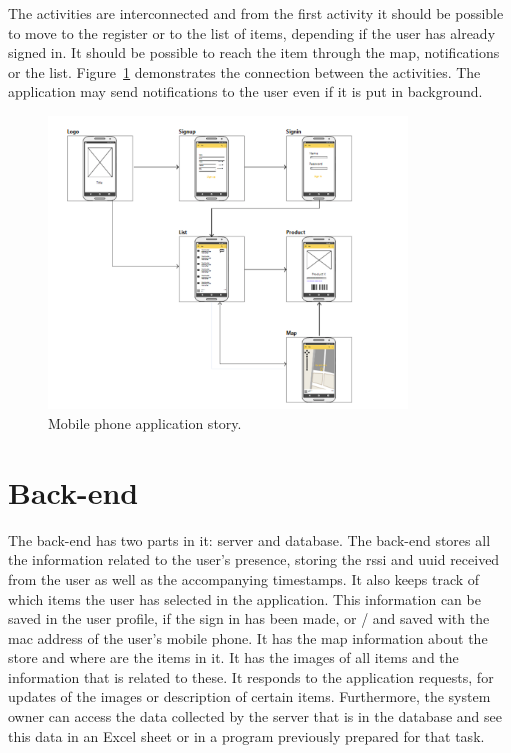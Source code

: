 The activities are interconnected and from the first activity it should be possible to move to the register or to the list of items, depending if the user has already signed in. It should be possible to reach the item through the map, notifications or the list.
Figure~\ref{fig:app_story} demonstrates the connection between the activities. The application may send notifications to the user even if it is put in background.
\begin{figure}[!htb]
	\centering
	\includegraphics[width=0.85\textwidth]{Figures/story.png}
	\caption[Mobile phone application story]{Mobile phone application story.}
	\label{fig:app_story}
\end{figure}

\section{Back-end}
\label{section:backend}

The back-end has two parts in it: server and database.
The back-end stores all the information related to the user's presence, storing the \gls{rssi} and \gls{uuid} received from the user as well as the accompanying timestamps. It also keeps track of which items the user has selected in the application. This information can be saved in the user profile, if the sign in has been made, or / and saved with the mac address of the user's mobile phone.
It has the map information about the store and where are the items in it.
It has the images of all items and the information that is related to these. 
It responds to the application requests, for updates of the images or description of certain items.
Furthermore, the system owner can access the data collected by the server that is in the database and see this data in an Excel sheet or in a program previously prepared for that task.

